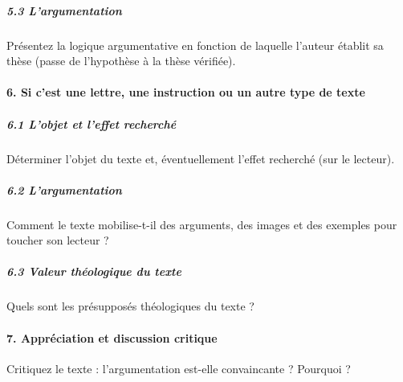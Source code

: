 \subparagraph{5.3	 L’argumentation }


Présentez la logique argumentative en fonction de laquelle l’auteur établit sa thèse (passe de l’hypothèse à la thèse vérifiée).

\paragraph{6.	Si c’est une lettre, une instruction ou un autre type de texte}

\subparagraph{	6.1 L’objet et l’effet recherché}

Déterminer l’objet du texte et, éventuellement l’effet recherché (sur le lecteur).

\subparagraph{6.2	 L’argumentation}

Comment le texte mobilise-t-il des arguments, des images et des exemples pour toucher son lecteur ?

\subparagraph{6.3	 Valeur théologique du texte}

Quels sont les présupposés théologiques du texte ?


\paragraph{7.  Appréciation et discussion critique }

Critiquez le texte : l’argumentation est-elle convaincante ? Pourquoi ?
